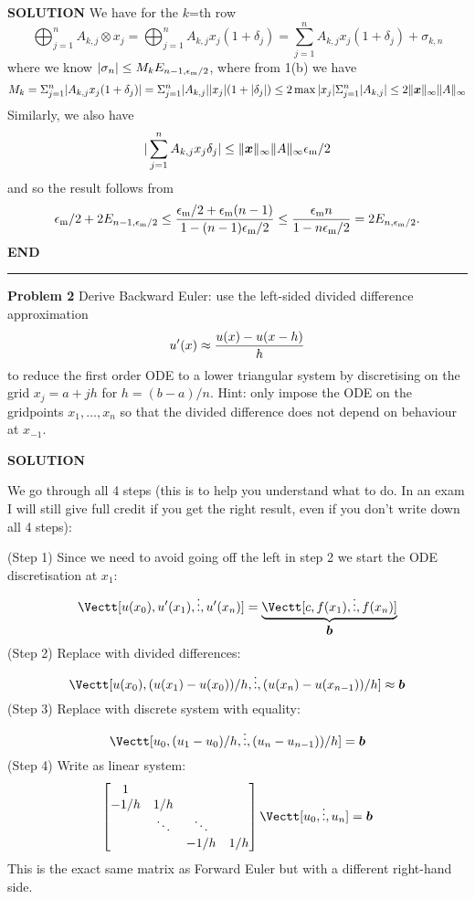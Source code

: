 \documentclass[12pt,a4paper]{article}
\def\x{ {\vc x} }
\def\b{ {\vc b} }
\begin{document}
\textbf{SOLUTION} We have for the $k$=th row
\[
\ensuremath{\bigoplus}_{j=1}^n A_{k,j} \ensuremath{\otimes} x_j =  \ensuremath{\bigoplus}_{j=1}^n A_{k,j} x_j (1+\ensuremath{\delta}_j) = 
\ensuremath{\sum}_{j=1}^n A_{k,j} x_j (1+\ensuremath{\delta}_j) + \ensuremath{\sigma}_{k,n}
\]
where we know $|\ensuremath{\sigma}_n| \ensuremath{\leq} M_k E_{n-1,\ensuremath{\epsilon}_{\rm m}/2}$, where from 1(b) we have
\[
M_k = \ensuremath{\Sigma}_{j=1}^n |A_{k,j}x_j (1+\ensuremath{\delta}_j)| = \ensuremath{\Sigma}_{j=1}^n |A_{k,j}| |x_j| (1+|\ensuremath{\delta}_j|)  \ensuremath{\leq} 2 \max |x_j| \ensuremath{\Sigma}_{j=1}^n |A_{k,j}|
\ensuremath{\leq} 2 \|\ensuremath{\bm{\x}}\|_\ensuremath{\infty} \|A \|_\ensuremath{\infty}
\]
Similarly, we also have 
\[
|\ensuremath{\sum}_{j=1}^n A_{k,j} x_j \ensuremath{\delta}_j| \ensuremath{\leq} \|\ensuremath{\bm{\x}}\|_\ensuremath{\infty} \|A \|_\ensuremath{\infty} \ensuremath{\epsilon}_{\rm m}/2
\]
and so the result follows from
\[
\ensuremath{\epsilon}_{\rm m}/2 + 2E_{n-1,\ensuremath{\epsilon}_{\rm m}/2} \ensuremath{\leq} {\ensuremath{\epsilon}_{\rm m}/2 + \ensuremath{\epsilon}_{\rm m} (n-1) \over 1-(n-1)\ensuremath{\epsilon}_{\rm m}/2} \ensuremath{\leq} {\ensuremath{\epsilon}_{\rm m} n \over 1-n\ensuremath{\epsilon}_{\rm m}/2} = 2E_{n,\ensuremath{\epsilon}_{\rm m}/2}.
\]
\textbf{END}

\rule{\textwidth}{1pt}
\textbf{Problem 2} Derive  Backward Euler: use the left-sided divided difference approximation
\[
u'(x) \ensuremath{\approx} {u(x) - u(x-h)  \over h}
\]
to reduce the first order ODE
to a lower triangular system by discretising on the grid $x_j = a + j h$ for $h = (b-a)/n$. Hint: only impose the ODE on the gridpoints $x_1,\ensuremath{\ldots},x_n$ so that the divided difference does not depend on behaviour at $x_{-1}$.

\textbf{SOLUTION}

We go through all 4 steps (this is to help you understand what to do. In an exam I will still give full credit if you get the right result, even if you don't write down all 4 steps):

(Step 1) Since we need to avoid going off the left in step 2 we start the ODE discretisation at $x_1$:
\[
\Vectt[u(x_0), u'(x_1), \ensuremath{\vdots}, u'(x_n)] = \underbrace{\Vectt[c, f(x_1),\ensuremath{\vdots},f(x_n)]}_{\ensuremath{\bm{\b}}}
\]
(Step 2) Replace with divided differences:
\[
\Vectt[u(x_0), (u(x_1)-u(x_0))/h, \ensuremath{\vdots}, (u(x_n)-u(x_{n-1}))/h] \ensuremath{\approx} \ensuremath{\bm{\b}}
\]
(Step 3) Replace with discrete system with equality:
\[
\Vectt[u_0, (u_1-u_0)/h, \ensuremath{\vdots}, (u_n-u_{n-1}))/h] = \ensuremath{\bm{\b}}
\]
(Step 4) Write as linear system:
\[
\begin{bmatrix}
1 \\
-1/h & 1/h \\
& \ensuremath{\ddots} & \ensuremath{\ddots} \\
&& -1/h & 1/h 
\end{bmatrix} \Vectt[u_0,\ensuremath{\vdots},u_n] = \ensuremath{\bm{\b}}
\]
This is the exact same matrix as Forward Euler but with a different right-hand side.
\end{document}
